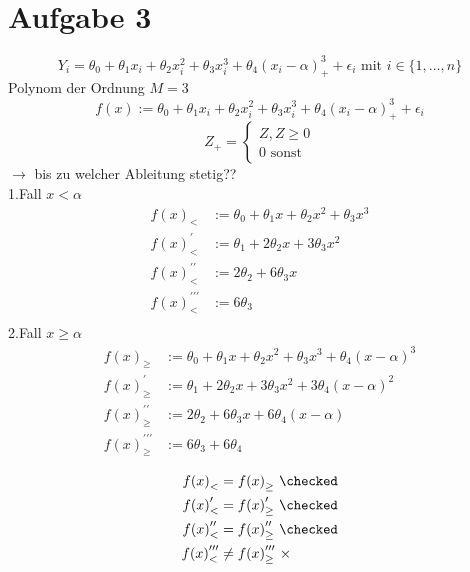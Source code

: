 \documentclass[10pt,a4paper]{article}
\begin{document}
\newpage
\section*{Aufgabe 3}
\[
  Y_i = \theta_0 + \theta_1 x_i + \theta_2 x_i^2 + \theta_3 x_i^3 + \theta_4 {(x_i - \alpha)}_+^3 +\epsilon_i
  \text{ mit } i \in \{1, \ldots , n\}
\]
Polynom der Ordnung \(M = 3\)
\[
  f(x):= \theta_0 + \theta_1 x_i + \theta_2 x_i^2 + \theta_3 x_i^3 + \theta_4 {(x_i - \alpha)}_+^3 +\epsilon_i
\]
\[
  Z_+=\begin{cases}
    Z, Z \geq 0 \\
   	0  \text{ sonst}
\end{cases}
\]
\( \rightarrow \) bis zu welcher Ableitung stetig??\\
1.Fall \( x< \alpha \)
\begin{align*}
    {f(x)}_{<} &:= \theta_0 + \theta_1 x + \theta_2 x^2 + \theta_3 x^3\\
    {f(x)}_{<}^{\prime} &:= \theta_1 + 2\theta_2 x + 3\theta_3 x^2\\
    {f(x)}_{<}^{\prime \prime} &:= 2\theta_2 + 6 \theta_3 x\\
    {f(x)}_{<}^{\prime \prime \prime} &:= 6 \theta_3\\
\end{align*}
2.Fall \( x \geq \alpha \)
\begin{align*}
    {f(x)}_{\geq} &:= \theta_0 + \theta_1 x + \theta_2 x^2 + \theta_3 x^3 + \theta_4 {(x - \alpha)}^3\\
    {f(x)}_{\geq}^{\prime} &:= \theta_1 + 2\theta_2 x + 3\theta_3 x^2 + 3 \theta_4 {(x-\alpha)}^2\\
    {f(x)}_{\geq}^{\prime \prime} &:= 2\theta_2 + 6 \theta_3 x + 6 \theta_4 (x-\alpha)\\
    {f(x)}_{\geq}^{\prime \prime \prime} &:= 6 \theta_3 + 6 \theta_4\\
\end{align*}
\begin{align*}
  {f(x)}_{<} &= {f(x)}_{\geq} \text{ } \checked \\
  {f(x)}_{<}^{\prime} &=   {f(x)}_{\geq}^{\prime} \text{ } \checked \\
  {f(x)}_{<}^{\prime \prime} &= {f(x)}_{\geq}^{\prime \prime}  \text{ } \checked \\
  {f(x)}_{<}^{\prime \prime \prime} &\neq {f(x)}_{\geq}^{\prime \prime \prime} \text{ } \times \\
\end{align*}
\end{document}
